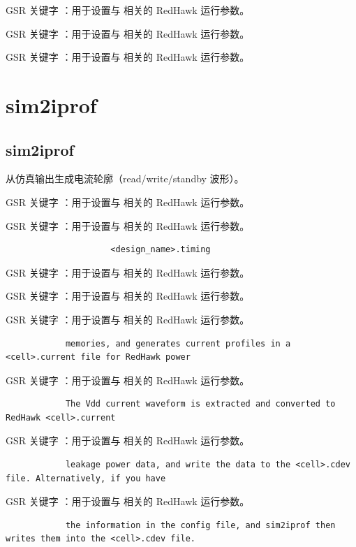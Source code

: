 GSR 关键字 ：用于设置与  相关的 RedHawk 运行参数。

GSR 关键字 ：用于设置与  相关的 RedHawk 运行参数。

GSR 关键字 ：用于设置与  相关的 RedHawk 运行参数。

\section{sim2iprof}
\subsection*{sim2iprof}

从仿真输出生成电流轮廓（read/write/standby 波形）。

GSR 关键字 ：用于设置与  相关的 RedHawk 运行参数。

GSR 关键字 ：用于设置与  相关的 RedHawk 运行参数。

\begin{lstlisting}
                     <design_name>.timing
\end{lstlisting}

GSR 关键字 ：用于设置与  相关的 RedHawk 运行参数。

GSR 关键字 ：用于设置与  相关的 RedHawk 运行参数。

GSR 关键字 ：用于设置与  相关的 RedHawk 运行参数。

\begin{lstlisting}
            memories, and generates current profiles in a <cell>.current file for RedHawk power
\end{lstlisting}

GSR 关键字 ：用于设置与  相关的 RedHawk 运行参数。

\begin{lstlisting}
            The Vdd current waveform is extracted and converted to RedHawk <cell>.current
\end{lstlisting}

GSR 关键字 ：用于设置与  相关的 RedHawk 运行参数。

\begin{lstlisting}
            leakage power data, and write the data to the <cell>.cdev file. Alternatively, if you have
\end{lstlisting}

GSR 关键字 ：用于设置与  相关的 RedHawk 运行参数。

\begin{lstlisting}
            the information in the config file, and sim2iprof then writes them into the <cell>.cdev file.
\end{lstlisting}


